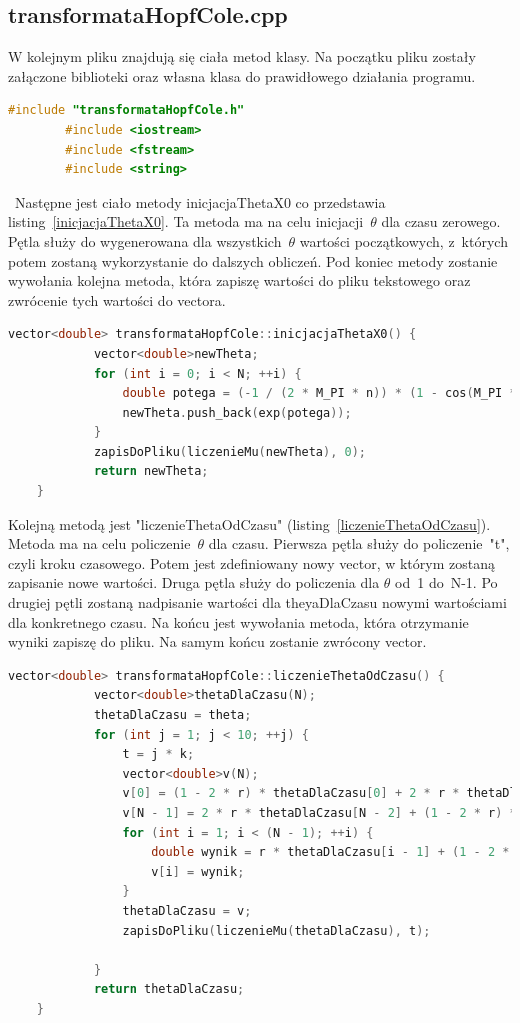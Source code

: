 \documentclass[a4paper,12pt]{article}
\begin{document}
	\subsection{transformataHopfCole.cpp}
	W kolejnym pliku znajdują się ciała metod klasy. Na początku pliku zostały załączone biblioteki oraz własna klasa do prawidłowego działania programu. 
	\begin{lstlisting}[caption={poczadek pliku transformataHopfCole.cpp},label={poczadek.cpp}, language=C++]
		#include "transformataHopfCole.h"
		#include <iostream>
		#include <fstream>
		#include <string>\end{lstlisting}
	\	Następne jest ciało metody inicjacjaThetaX0 co przedstawia listing~\ref{inicjacjaThetaX0}. Ta metoda ma na celu inicjacji~$\theta$ dla czasu zerowego. Pętla służy do wygenerowana dla wszystkich~$\theta$ wartości początkowych, z~których potem zostaną wykorzystanie do dalszych obliczeń. Pod koniec metody zostanie wywołania kolejna metoda, która zapiszę wartości do pliku tekstowego oraz zwrócenie tych wartości do vectora.
	\begin{lstlisting}[caption={ciało metody inicjacjaThetaX0},label={inicjacjaThetaX0}, language=C++]
		vector<double> transformataHopfCole::inicjacjaThetaX0() {
			vector<double>newTheta;
			for (int i = 0; i < N; ++i) {
				double potega = (-1 / (2 * M_PI * n)) * (1 - cos(M_PI * (i * h)));
				newTheta.push_back(exp(potega));
			}
			zapisDoPliku(liczenieMu(newTheta), 0);
			return newTheta;
	}\end{lstlisting}
	Kolejną metodą jest "liczenieThetaOdCzasu" (listing~\ref{liczenieThetaOdCzasu}). Metoda ma na celu policzenie~$\theta$ dla czasu. Pierwsza pętla służy do policzenie~"t", czyli kroku czasowego. Potem jest zdefiniowany nowy vector, w którym zostaną zapisanie nowe wartości. Druga pętla służy do policzenia dla $\theta$ od~1 do~N-1. Po drugiej pętli zostaną nadpisanie wartości dla theyaDlaCzasu nowymi wartościami dla konkretnego czasu. Na końcu jest wywołania metoda, która otrzymanie wyniki zapiszę do pliku. Na samym końcu zostanie zwrócony vector.   
	\begin{lstlisting}[caption={ciało metody liczenieThetaOdCzasu},label={liczenieThetaOdCzasu}, language=C++]
		vector<double> transformataHopfCole::liczenieThetaOdCzasu() {
			vector<double>thetaDlaCzasu(N);
			thetaDlaCzasu = theta;
			for (int j = 1; j < 10; ++j) {
				t = j * k;
				vector<double>v(N);
				v[0] = (1 - 2 * r) * thetaDlaCzasu[0] + 2 * r * thetaDlaCzasu[1]; //warunki brzegowe  
				v[N - 1] = 2 * r * thetaDlaCzasu[N - 2] + (1 - 2 * r) * thetaDlaCzasu[N - 1];
				for (int i = 1; i < (N - 1); ++i) {
					double wynik = r * thetaDlaCzasu[i - 1] + (1 - 2 * r) * thetaDlaCzasu[i] + r * thetaDlaCzasu[i + 1];
					v[i] = wynik;
				}
				thetaDlaCzasu = v;
				zapisDoPliku(liczenieMu(thetaDlaCzasu), t);
				
			}
			return thetaDlaCzasu;
	}\end{lstlisting}
\end{document}
